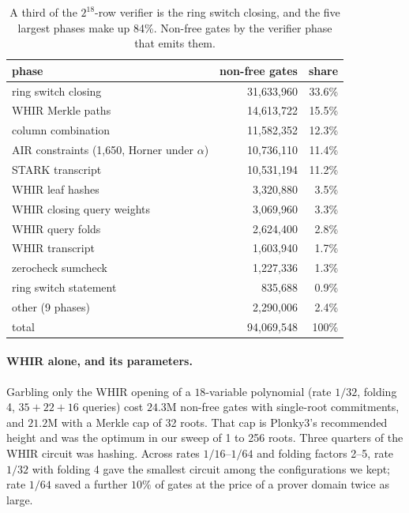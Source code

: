 \documentclass[11pt]{article}
\begin{document}
\begin{table}[t]\centering\small
\begin{tabular}{lrr}\toprule
phase & non-free gates & share\\\midrule
ring switch closing & 31{,}633{,}960 & 33.6\%\\
WHIR Merkle paths & 14{,}613{,}722 & 15.5\%\\
column combination & 11{,}582{,}352 & 12.3\%\\
AIR constraints (1{,}650, Horner under $\alpha$) & 10{,}736{,}110 & 11.4\%\\
STARK transcript & 10{,}531{,}194 & 11.2\%\\
WHIR leaf hashes & 3{,}320{,}880 & 3.5\%\\
WHIR closing query weights & 3{,}069{,}960 & 3.3\%\\
WHIR query folds & 2{,}624{,}400 & 2.8\%\\
WHIR transcript & 1{,}603{,}940 & 1.7\%\\
zerocheck sumcheck & 1{,}227{,}336 & 1.3\%\\
ring switch statement & 835{,}688 & 0.9\%\\
other (9 phases) & 2{,}290{,}006 & 2.4\%\\\midrule
total & 94{,}069{,}548 & 100\%\\\bottomrule
\end{tabular}
\caption{A third of the $2^{18}$-row verifier is the ring switch closing, and the
five largest phases make up 84\%. Non-free gates by the verifier phase that emits
them.}
\label{tab:profile}
\end{table}

\paragraph{WHIR alone, and its parameters.} Garbling only the WHIR opening of a
$18$-variable polynomial (rate $1/32$, folding 4, $35+22+16$ queries) cost
$24.3$M non-free gates with single-root commitments, and $21.2$M with a Merkle
cap of 32 roots. That cap is Plonky3's recommended height and was the optimum in
our sweep of 1 to 256 roots. Three quarters of the WHIR circuit was hashing.
Across rates $1/16$--$1/64$ and folding factors 2--5, rate $1/32$ with folding 4
gave the smallest circuit among the configurations we kept; rate $1/64$ saved a
further $10\%$ of gates at the price of a prover domain twice as large.
\end{document}

